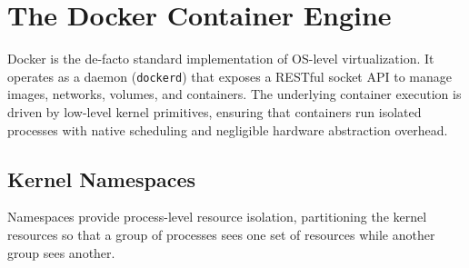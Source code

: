 \section{The Docker Container Engine}
Docker is the de-facto standard implementation of OS-level virtualization. It operates as a daemon (\texttt{dockerd}) that exposes a RESTful socket API to manage images, networks, volumes, and containers. The underlying container execution is driven by low-level kernel primitives, ensuring that containers run isolated processes with native scheduling and negligible hardware abstraction overhead.

\subsection{Kernel Namespaces}
Namespaces provide process-level resource isolation, partitioning the kernel resources so that a group of processes sees one set of resources while another group sees another.
